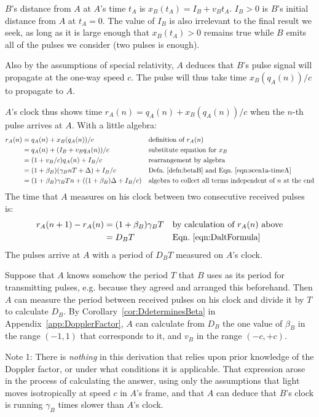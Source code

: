 \documentclass[a4paper]{article}
\theoremstyle{plain}
\theoremstyle{definition}
\begin{document}
$B$'s distance from $A$ at $A$'s time $t_A$ is
$x_B(t_A) = I_B + v_B t_A$.
$I_B > 0$ is $B$'s initial distance from $A$ at $t_A=0$.
The value of $I_B$ is also irrelevant to the final result we seek,
as long as it is large enough that $x_B(t_A) > 0$ remains
true while $B$ emits all of the pulses we consider (two pulses is enough).

Also by the assumptions of special relativity, $A$ deduces that $B$'s
pulse signal will propagate at the one-way speed $c$.  The pulse will
thus take time $x_B(q_A(n))/c$ to propagate to $A$.

$A$'s clock thus shows time $r_A(n) = q_A(n) + x_B(q_A(n))/c$ when the $n$-th
pulse arrives at $A$.  With a little algebra:
\begin{align*}
r_A(n)
  & = q_A(n) + x_B(q_A(n))/c & & \text{definition of $r_A(n)$} \\
  & = q_A(n) + (I_B + v_B q_A(n))/c & & \text{substitute equation for $x_B$} \\
  & = (1 + v_B/c) q_A(n) + I_B/c & & \text{rearrangement by algebra} \\
  & = (1 + \beta_B) (\gamma_B nT + \Delta) + I_B/c & & \text{Defn.~\eqref{defn:betaB} and Eqn.~\eqref{eqn:scen1a-timeA}} \\
  & = (1 + \beta_B) \gamma_B Tn + ((1 + \beta_B) \Delta + I_B/c) & & \text{algebra to collect all terms independent of $n$ at the end}
\end{align*}
The time that $A$ measures on his clock between two consecutive received
pulses is:
\begin{align*}
r_A(n+1) - r_A(n)
  & = (1 + \beta_B) \gamma_B T & & \text{by calculation of $r_A(n)$ above} \\
  & = D_B T & & \text{Eqn.~\eqref{eqn:DaltFormula}}
\end{align*}
The pulses arrive at $A$ with a period of $D_B T$ measured on $A$'s clock.

Suppose that $A$ knows somehow the period $T$ that $B$ uses as its
period for transmitting pulses, e.g. because they agreed and arranged
this beforehand.  Then $A$ can measure the period between received
pulses on his clock and divide it by $T$ to calculate $D_B$.
By Corollary~\ref{cor:DdeterminesBeta} in
Appendix~\ref{app:DopplerFactor}, $A$ can calculate from $D_B$ the one
value of $\beta_B$ in the range $(-1, 1)$ that corresponds to it, and
$v_B$ in the range $(-c, +c)$.

Note 1: There is {\em nothing} in this derivation that relies upon prior
knowledge of the Doppler factor, or under what conditions it is
applicable.  That expression arose in
the process of calculating the answer, using only the assumptions that
light moves isotropically at speed $c$ in $A$'s frame, and that $A$
can deduce that $B$'s clock is running $\gamma_B$ times slower than
$A$'s clock.
\end{document}
